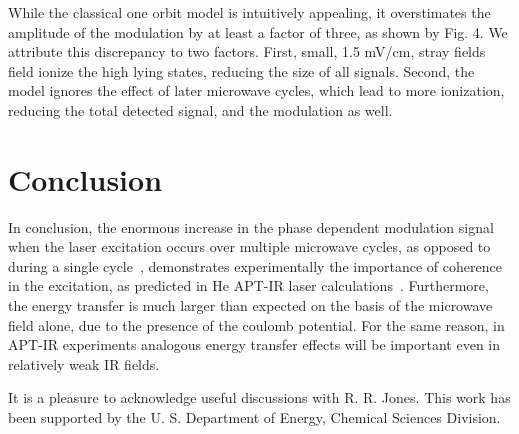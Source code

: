 \documentclass[pra, reprint]{revtex4-1}
\begin{document}
While the classical one orbit model is intuitively appealing, it overstimates the amplitude of the modulation by at least a factor of three, as shown by Fig. 4. We attribute this discrepancy to two factors. First, small, 1.5 mV/cm, stray fields field ionize the high lying states, reducing the size of all signals. 
Second, the model ignores the effect of later microwave cycles, which lead to more ionization, reducing the total detected signal, and the modulation as well.

\section{Conclusion}
\label{sec:conclusion}
In conclusion, the enormous increase in the phase dependent modulation signal when the laser excitation occurs over multiple microwave cycles, as opposed to during a single cycle~\cite{Overstreet_2011}, demonstrates experimentally the importance of coherence in the excitation, as predicted in He APT-IR laser calculations~\cite{Johnsson_2005}. Furthermore, the energy transfer is much larger than expected on the basis of the microwave field alone, due to the presence of the coulomb potential. For the same reason, in APT-IR experiments analogous energy transfer effects will be important even in relatively weak IR fields.

\begin{acknowledgments}
It is a pleasure to acknowledge useful discussions with R. R. Jones. This work has been supported by the U. S. Department of Energy, Chemical Sciences Division.  
\end{acknowledgments}



%
\end{document}
